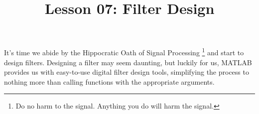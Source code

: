 \documentclass{article}
\title{Lesson 07: Filter Design}
\begin{document}
\renderTitle

It's time we abide by the Hippocratic Oath of Signal Processing%
\footnote{Do no harm to the signal.  Anything you do will harm the
signal.} and start to design filters.  Designing a filter may seem
daunting, but luckily for us, MATLAB provides us with easy-to-use
digital filter design tools, simplifying the process to nothing more than
calling functions with the appropriate arguments.
\end{document}
